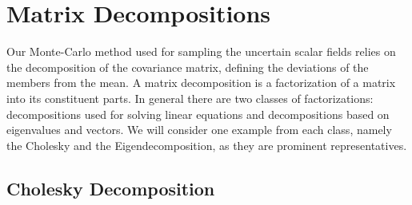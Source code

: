 \section{Matrix Decompositions}

Our Monte-Carlo method used for sampling the uncertain scalar fields
relies on the decomposition of the covariance matrix, defining the
deviations of the members from the mean. A matrix decomposition is a
factorization of a matrix into its constituent parts. In general there
are two classes of factorizations: decompositions used for solving
linear equations and decompositions based on eigenvalues and vectors. We
will consider one example from each class, namely the Cholesky and the
Eigendecomposition, as they are prominent representatives.

\subsection{Cholesky Decomposition}\label{sec:cholesky}

